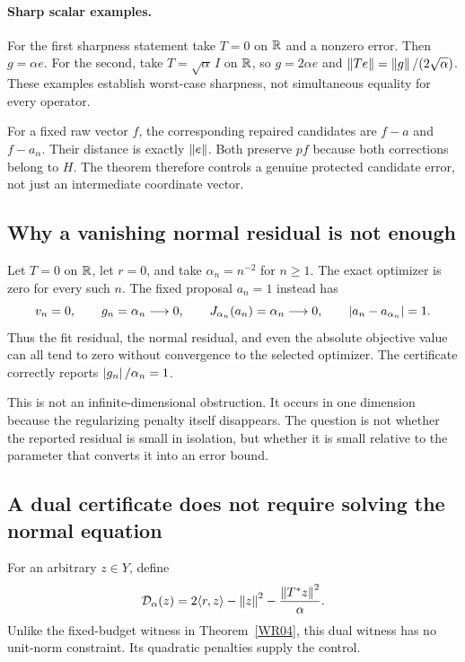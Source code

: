 \paragraph{Sharp scalar examples.} For the first sharpness statement take $T=0$ on $\mathbb R$ and a nonzero error. Then $g=\alpha e$. For the second, take $T=\sqrt\alpha\,I$ on $\mathbb R$, so $g=2\alpha e$ and $\left\lVert Te\right\rVert=\left\lVert g\right\rVert/(2\sqrt\alpha)$. These examples establish worst-case sharpness, not simultaneous equality for every operator.

For a fixed raw vector $f$, the corresponding repaired candidates are $f-a$ and $f-a_\alpha$. Their distance is exactly $\left\lVert e\right\rVert$. Both preserve $pf$ because both corrections belong to $H$. The theorem therefore controls a genuine protected candidate error, not just an intermediate coordinate vector.


\subsection{Why a vanishing normal residual is not enough}
Let $T=0$ on $\mathbb R$, let $r=0$, and take $\alpha_n=n^{-2}$ for $n\ge1$. The exact optimizer is zero for every such $n$. The fixed proposal $a_n=1$ instead has
\[
 v_n=0,\qquad g_n=\alpha_n\longrightarrow0,\qquad
 J_{\alpha_n}(a_n)=\alpha_n\longrightarrow0,
 \qquad\left\lvert a_n-a_{\alpha_n}\right\rvert=1.
\]
Thus the fit residual, the normal residual, and even the absolute objective value can all tend to zero without convergence to the selected optimizer. The certificate correctly reports $\left\lvert g_n\right\rvert/\alpha_n=1$.

This is not an infinite-dimensional obstruction. It occurs in one dimension because the regularizing penalty itself disappears. The question is not whether the reported residual is small in isolation, but whether it is small relative to the parameter that converts it into an error bound.

\subsection{A dual certificate does not require solving the normal equation}
For an arbitrary $z\in Y$, define
\[
 \mathcal D_\alpha(z)=2\langle r,z\rangle-\left\lVert z\right\rVert^2
                    -\frac{\left\lVert T^*z\right\rVert^2}{\alpha}.
\]
Unlike the fixed-budget witness in Theorem~\ref{WR04}, this dual witness has no unit-norm constraint. Its quadratic penalties supply the control.

